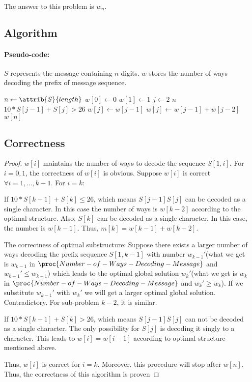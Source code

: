 \documentclass[]{article}
\begin{document}
            \paragraph{}The answer to this problem is $w_n$.
        \subsection{Algorithm}
        \paragraph{Pseudo-code:}$S$ represents the message containing $n$ digits. $w$ stores the number of ways decoding the prefix of message sequence.
        \begin{codebox}
\li $n \gets \attrib{S}{length}$
\li $w[0] \gets 0$
\li $w[1] \gets 1$
\li \For $j \gets 2$ \To $n$
\li     \Do
            \If $10*S[j-1]+S[j] > 26$
\li         \Then $w[j] \gets w[j-1]$
\li         \Else $w[j] \gets w[j-1] + w[j-2]$
            \End
        \End 
\li \Return $w[n]$
        \end{codebox}
        \subsection{Correctness}
            \begin{proof}
            $w[i]$ maintains the number of ways to decode the sequence $S[1,i]$. For $i = 0,1$, the correctness of $w[i]$ is obvious. Suppose $w[i]$ is correct $\forall i= 1,\dots,k-1$. For $i = k$:
                    \item If $10*S[k-1]+S[k] \leq 26$, which means $S[j-1]S[j]$ can be decoded as a single character. In this case the number of ways is $w[k-2]$ according to the optimal structure. Also, $S[k]$ can be decoded as a single character. In this case, the number is $w[k-1]$. Thus, $m[k] = w[k-1]+w[k-2]$.  
                    \item The correctness of optimal substructure: Suppose there exists a larger number of ways decoding the prefix sequence $S[1,k-1]$ with number $w_{k-1}'$(what we get is $w_{k-1}$ in $\proc{Number-of-Ways-Decoding-Message}$ and $w_{k-1}' \leq w_{k-1}$) which leads to the optimal global solution  $w_k'$(what we get is $w_k$ in $\proc{Number-of-Ways-Decoding-Message}$ and $w_k' \geq w_k$). If we substitute $w_{k-1}'$ with $w_{k}'$ we will get a larger optimal global solution. Contradictory. For sub-problem $k-2$, it is similar.
                    \item If $10*S[k-1]+S[k] > 26$, which means $S[j-1]S[j]$ can not be decoded as a single character. The only possibility for $S[j]$ is decoding it singly to a character. This leads to $w[i] = w[i-1]$ according to optimal structure mentioned above.
                    \item Thus, $w[i]$ is correct for $i=k$. Moreover, this procedure will stop after $w[n]$. Thus, the correctness of this algorithm is proven
            \end{proof}   
\end{document}
